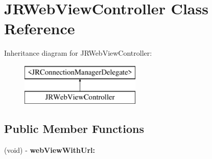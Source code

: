 \hypertarget{interface_j_r_web_view_controller}{
\section{JRWebViewController Class Reference}
\label{interface_j_r_web_view_controller}
}
Inheritance diagram for JRWebViewController:\begin{figure}[H]
\begin{center}
\leavevmode
\includegraphics[height=2.000000cm]{interface_j_r_web_view_controller}
\end{center}
\end{figure}
\subsection*{Public Member Functions}
\begin{DoxyCompactItemize}
\item 
\hypertarget{interface_j_r_web_view_controller_ad29dd8c54c521c5984b0b521d7a3ccba}{
(void) -\/ {\bfseries webViewWithUrl:}}
\label{interface_j_r_web_view_controller_ad29dd8c54c521c5984b0b521d7a3ccba}

\end{DoxyCompactItemize}
